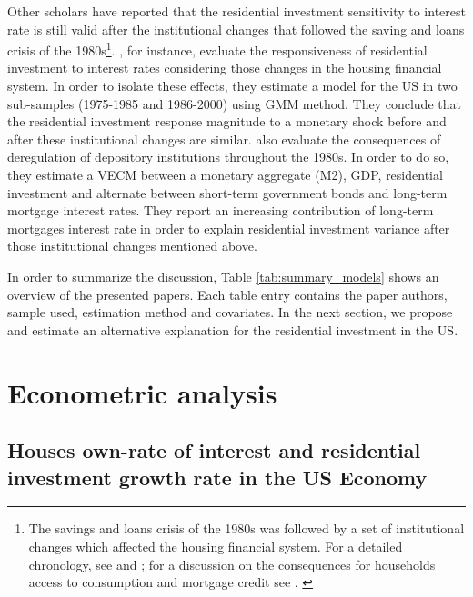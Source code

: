\documentclass[12pt, a4paper]{article}
\begin{document}
Other scholars have reported that the residential investment sensitivity to interest rate is still valid after the institutional changes that followed the saving and loans crisis of the 1980s\footnote{The savings and loans crisis of the 1980s was followed by a set of institutional changes which affected the housing financial system. For a detailed chronology, see  \textcite[Appendix B]{mccarthyMonetaryPolicyTransmission2002} and \textcite{green_american_2005}; for a discussion on the consequences for households access to consumption and mortgage credit see \textcite{federal_deposit_insurance_corporation_savings_1997,wall_too_2010}. \label{nota_instituicoes}}.
\textcite{mccarthyMonetaryPolicyTransmission2002}, for instance, evaluate the responsiveness of residential investment to interest rates considering those changes in the housing financial system.
In order to isolate these effects, they estimate  a model for the US in two sub-samples (1975-1985 and 1986-2000) using GMM method.
They conclude that the residential investment response magnitude to a monetary shock before and after these institutional changes are similar.
\textcite{gauger_residential_2003} also evaluate the consequences of deregulation of depository institutions throughout the 1980s.
In order to do so, they estimate a VECM between a monetary aggregate (M2), GDP, residential investment and alternate between short-term government bonds and long-term mortgage interest rates.
They report an increasing contribution of long-term mortgages interest rate in order to explain residential investment variance after those institutional changes mentioned above.


In order to summarize the discussion, Table \ref{tab:summary_models} shows an overview of the presented papers.
Each table entry contains the paper authors, sample used, estimation method and covariates.
In the next section, we propose and estimate an alternative explanation for the residential investment in the US.




\section{Econometric analysis}
\label{sec:org1ef341b}
\label{sec:VECM}
\subsection{Houses own-rate of interest and residential investment growth rate in the US Economy}
\label{sec:orga2e1cdc}
\label{sec:own}
\end{document}
